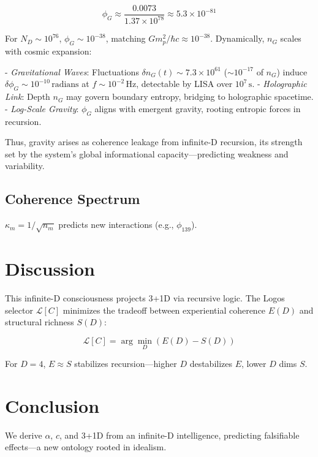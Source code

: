 \documentclass[12pt]{article}
\begin{document}
\[
\phi_G \approx \frac{0.0073}{1.37 \times 10^{78}} \approx 5.3 \times 10^{-81}
\]

For \(N_D \sim 10^{76}\), \(\phi_G \sim 10^{-38}\), matching \(G m_p^2 / \hbar c \approx 10^{-38}\). Dynamically, \(n_G\) scales with cosmic expansion:

- \textit{Gravitational Waves}: Fluctuations \(\delta n_G(t) \sim 7.3 \times 10^{61}\) (\(\sim 10^{-17}\) of \(n_G\)) induce \(\delta \phi_G \sim 10^{-10} \, \text{radians}\) at \(f \sim 10^{-2} \, \text{Hz}\), detectable by LISA over \(10^7 \, \text{s}\).
- \textit{Holographic Link}: Depth \(n_G\) may govern boundary entropy, bridging to holographic spacetime.
- \textit{Log-Scale Gravity}: \(\phi_G\) aligns with emergent gravity, rooting entropic forces in recursion.

Thus, gravity arises as coherence leakage from infinite-D recursion, its strength set by the system's global informational capacity—predicting weakness and variability.

\subsection{Coherence Spectrum}
\(\kappa_m = 1/\sqrt{n_m}\) predicts new interactions (e.g., \(\phi_{139}\)).

\section{Discussion}

This infinite-D consciousness projects 3+1D via recursive logic. The Logos selector \(\mathcal{L}[C]\) minimizes the tradeoff between experiential coherence \(E(D)\) and structural richness \(S(D)\):

\[
\mathcal{L}[C] = \arg\min_D \left( E(D) - S(D) \right)
\]

For \(D=4\), \(E \approx S\) stabilizes recursion—higher \(D\) destabilizes \(E\), lower \(D\) dims \(S\).

\section{Conclusion}

We derive \(\alpha\), \(c\), and 3+1D from an infinite-D intelligence, predicting falsifiable effects—a new ontology rooted in idealism.
\end{document}

